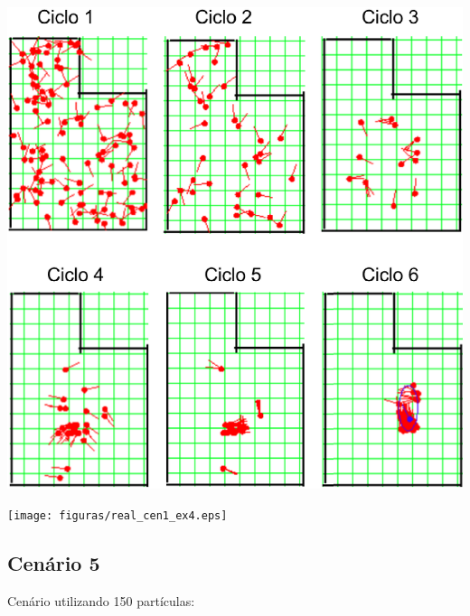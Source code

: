 {\centering
\includegraphics[scale=0.4]{figuras/cen1_ex4.eps}
\label{img:cen1_ex4}
\par}

{\centering
\texttt{[image: figuras/real\_cen1\_ex4.eps]}
\label{img:real_cen1_ex4}
\par}

\subsection{Cenário 5}

Cenário utilizando 150 partículas:

